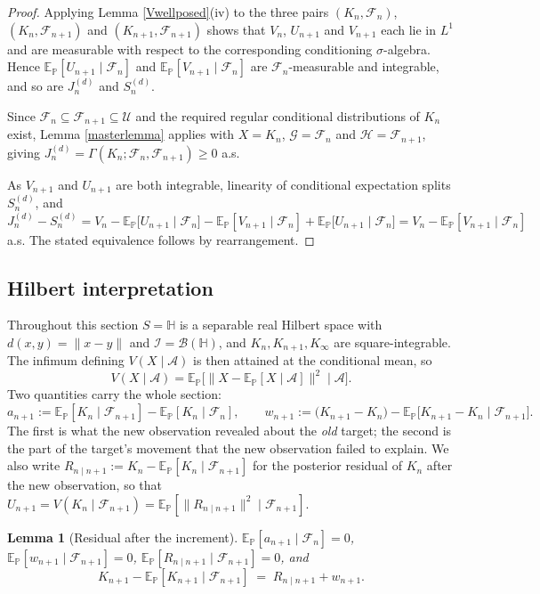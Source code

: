 \documentclass{article}
\newcommand{\E}{\mathbb{E}_{\mathbb{P}}}
\newcommand{\F}{\mathcal{F}}
\newcommand{\I}{\mathcal{I}}
\newcommand{\B}{\mathcal{B}}
\newcommand{\1}{\mathbbm{1}}
\newtheorem{lemma}{Lemma}
\begin{document}
\begin{proof}
Applying Lemma \ref{Vwellposed}(iv) to the three pairs $(K_n,\F_n)$, $(K_n,\F_{n+1})$ and
$(K_{n+1},\F_{n+1})$ shows that $V_n$, $U_{n+1}$ and $V_{n+1}$ each lie in $L^1$ and are measurable
with respect to the corresponding conditioning $\sigma$-algebra. Hence $\E[U_{n+1}\mid\F_n]$ and
$\E[V_{n+1}\mid\F_n]$ are $\F_n$-measurable and integrable, and so are $J_n^{(d)}$ and $S_n^{(d)}$.

Since $\F_n\subseteq\F_{n+1}\subseteq\mathcal{U}$ and the required regular conditional distributions
of $K_n$ exist, Lemma \ref{masterlemma} applies with $X=K_n$, $\mathcal{G}=\F_n$ and
$\mathcal{H}=\F_{n+1}$, giving $J_n^{(d)}=\Gamma(K_n;\F_n,\F_{n+1})\ge 0$ a.s.

As $V_{n+1}$ and $U_{n+1}$ are both integrable, linearity of conditional expectation splits
$S_n^{(d)}$, and
\[
J_n^{(d)}-S_n^{(d)}
=V_n-\E\big[U_{n+1}\mid\F_n\big]-\E[V_{n+1}\mid\F_n]+\E\big[U_{n+1}\mid\F_n\big]
=V_n-\E[V_{n+1}\mid\F_n]
\]
a.s. The stated equivalence follows by rearrangement.
\end{proof}

\subsection{Hilbert interpretation}

Throughout this section $S=\mathbb{H}$ is a separable real Hilbert space with $d(x,y)=\|x-y\|$ and
$\I=\B(\mathbb{H})$, and $K_n,K_{n+1},K_\infty$ are square-integrable. The infimum defining
$V(X\mid\mathcal{A})$ is then attained at the conditional mean, so
\[
V(X\mid\mathcal{A})=\E\big[\|X-\E[X\mid\mathcal{A}]\|^2\;\big|\;\mathcal{A}\big].
\]
Two quantities carry the whole section:
\[
a_{n+1}:=\E[K_n\mid\F_{n+1}]-\E[K_n\mid\F_n],
\qquad
w_{n+1}:=\big(K_{n+1}-K_n\big)-\E\big[K_{n+1}-K_n\mid\F_{n+1}\big].
\]
The first is what the new observation revealed about the \emph{old} target; the second is the part
of the target's movement that the new observation failed to explain. We also write
$R_{n\mid n+1}:=K_n-\E[K_n\mid\F_{n+1}]$ for the posterior residual of $K_n$ after the new
observation, so that $U_{n+1}=V(K_n\mid\F_{n+1})=\E[\|R_{n\mid n+1}\|^2\mid\F_{n+1}]$.

\begin{lemma}[Residual after the increment]
\label{increment}
$\E[a_{n+1}\mid\F_n]=0$, $\E[w_{n+1}\mid\F_{n+1}]=0$, $\E[R_{n\mid n+1}\mid\F_{n+1}]=0$, and
\[
K_{n+1}-\E[K_{n+1}\mid\F_{n+1}]\;=\;R_{n\mid n+1}+w_{n+1}.
\]
\end{lemma}
\end{document}
